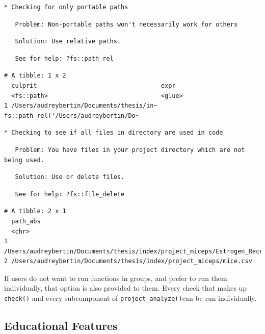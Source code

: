 \documentclass[12pt,twoside]{reedthesis}
\begin{document}
\begin{verbatim}
* Checking for only portable paths
\end{verbatim}
\begin{verbatim}
   Problem: Non-portable paths won't necessarily work for others
\end{verbatim}
\begin{verbatim}
   Solution: Use relative paths.
\end{verbatim}
\begin{verbatim}
   See for help: ?fs::path_rel
\end{verbatim}
\begin{verbatim}
# A tibble: 1 x 2
  culprit                                  expr                                 
  <fs::path>                               <glue>                               
1 /Users/audreybertin/Documents/thesis/in~ fs::path_rel('/Users/audreybertin/Do~
\end{verbatim}
\begin{verbatim}
* Checking to see if all files in directory are used in code
\end{verbatim}
\begin{verbatim}
   Problem: You have files in your project directory which are not being used.
\end{verbatim}
\begin{verbatim}
   Solution: Use or delete files.
\end{verbatim}
\begin{verbatim}
   See for help: ?fs::file_delete
\end{verbatim}
\begin{verbatim}
# A tibble: 2 x 1
  path_abs                                                                      
  <chr>                                                                         
1 /Users/audreybertin/Documents/thesis/index/project_miceps/Estrogen_Receptors.~
2 /Users/audreybertin/Documents/thesis/index/project_miceps/mice.csv            
\end{verbatim}
If users do not want to run functions in groups, and prefer to run them
individually, that option is also provided to them. Every check that
makes up \texttt{check()} and every subcomponent of
\texttt{project\_analyze()}can be run individually.

\subsection{Educational Features}\label{educational-features}
\end{document}
